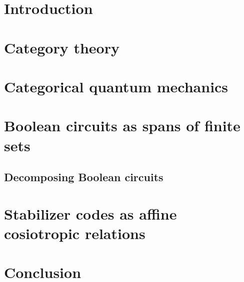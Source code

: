 \documentclass[12pt]{ociamthesis}  %
\begin{document}
\tableofcontents

\chapter{Introduction}
\label{chap:intro}


\chapter{Category theory}





\chapter{Categorical quantum mechanics}


\chapter{Boolean circuits as spans of finite sets}
\label{chap:zxa}


\section{Decomposing Boolean circuits}
\label{sec:dist}


\chapter{Stabilizer codes as affine cosiotropic relations}
\label{chap:stab}


%

\chapter{Conclusion}
\label{chap:conclusion}



%

\end{document}
